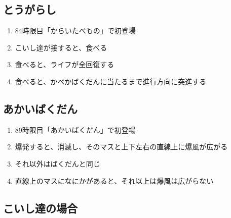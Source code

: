 \subsection{とうがらし}
\begin{enumerate}[label={\sarrow}]
\item 84時限目「からいたべもの」で初登場
\item こいし達が接すると、食べる
\item 食べると、ライフが全回復する
\item 食べると、かべかばくだんに当たるまで進行方向に突進する
\end{enumerate}


\subsection{あかいばくだん}
\begin{enumerate}[label={\sarrow}]
\item 89時限目「あかいばくだん」で初登場
\item 爆発すると、消滅し、そのマスと上下左右の直線上に爆風が広がる
\item それ以外はばくだんと同じ
\item 直線上のマスになにかがあると、それ以上は爆風は広がらない
\end{enumerate}



\clearpage


\subsection{こいし達の場合}

